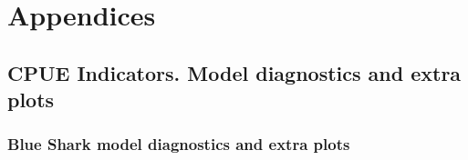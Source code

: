 \documentclass[12pt,draft]{article}
\begin{document}



\section{Appendices}
% 
\subsection{CPUE Indicators.  Model diagnostics and extra plots}

% 

 \subsubsection*{Blue Shark model diagnostics and extra plots}

%   
%   
%   
%   
 
 
%  
%  
%  
 
\end{document}
